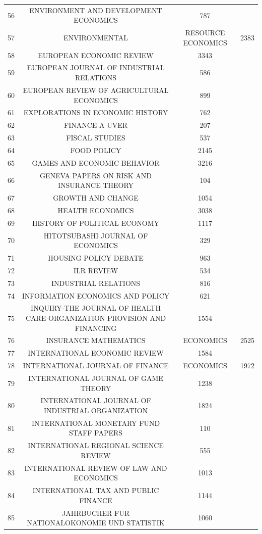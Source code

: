 \begin{tabular}{@{\extracolsep{5pt}} ccc}
56 & ENVIRONMENT AND DEVELOPMENT ECONOMICS & 787 \\ 
57 & ENVIRONMENTAL & RESOURCE ECONOMICS & 2383 \\ 
58 & EUROPEAN ECONOMIC REVIEW & 3343 \\ 
59 & EUROPEAN JOURNAL OF INDUSTRIAL RELATIONS & 586 \\ 
60 & EUROPEAN REVIEW OF AGRICULTURAL ECONOMICS & 899 \\ 
61 & EXPLORATIONS IN ECONOMIC HISTORY & 762 \\ 
62 & FINANCE A UVER & 207 \\ 
63 & FISCAL STUDIES & 537 \\ 
64 & FOOD POLICY & 2145 \\ 
65 & GAMES AND ECONOMIC BEHAVIOR & 3216 \\ 
66 & GENEVA PAPERS ON RISK AND INSURANCE THEORY & 104 \\ 
67 & GROWTH AND CHANGE & 1054 \\ 
68 & HEALTH ECONOMICS & 3038 \\ 
69 & HISTORY OF POLITICAL ECONOMY & 1117 \\ 
70 & HITOTSUBASHI JOURNAL OF ECONOMICS & 329 \\ 
71 & HOUSING POLICY DEBATE & 963 \\ 
72 & ILR REVIEW & 534 \\ 
73 & INDUSTRIAL RELATIONS & 816 \\ 
74 & INFORMATION ECONOMICS AND POLICY & 621 \\ 
75 & INQUIRY-THE JOURNAL OF HEALTH CARE ORGANIZATION PROVISION AND FINANCING & 1554 \\ 
76 & INSURANCE MATHEMATICS & ECONOMICS & 2525 \\ 
77 & INTERNATIONAL ECONOMIC REVIEW & 1584 \\ 
78 & INTERNATIONAL JOURNAL OF FINANCE & ECONOMICS & 1972 \\ 
79 & INTERNATIONAL JOURNAL OF GAME THEORY & 1238 \\ 
80 & INTERNATIONAL JOURNAL OF INDUSTRIAL ORGANIZATION & 1824 \\ 
81 & INTERNATIONAL MONETARY FUND STAFF PAPERS & 110 \\ 
82 & INTERNATIONAL REGIONAL SCIENCE REVIEW & 555 \\ 
83 & INTERNATIONAL REVIEW OF LAW AND ECONOMICS & 1013 \\ 
84 & INTERNATIONAL TAX AND PUBLIC FINANCE & 1144 \\ 
85 & JAHRBUCHER FUR NATIONALOKONOMIE UND STATISTIK & 1060 \\ 

\end{tabular}

